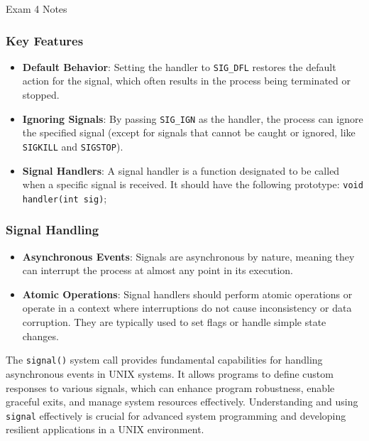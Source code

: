 \begin{examnotes}{Exam 4 Notes}
\begin{highlight}
        \subsubsection*{Key Features}

        \begin{itemize}
            \item \textbf{Default Behavior}: Setting the handler to \texttt{SIG\_DFL} restores the default action for the signal, which often results in the process being terminated or stopped.
            \item \textbf{Ignoring Signals}: By passing \texttt{SIG\_IGN} as the handler, the process can ignore the specified signal (except for signals that cannot be caught or ignored, like \texttt{SIGKILL} and \texttt{SIGSTOP}).
            \item \textbf{Signal Handlers}: A signal handler is a function designated to be called when a specific signal is received. It should have the following prototype: \texttt{void handler(int sig)};
        \end{itemize}

        \subsubsection*{Signal Handling}

        \begin{itemize}
            \item \textbf{Asynchronous Events}: Signals are asynchronous by nature, meaning they can interrupt the process at almost any point in its execution.
            \item \textbf{Atomic Operations}: Signal handlers should perform atomic operations or operate in a context where interruptions do not cause inconsistency or data corruption. They are 
            typically used to set flags or handle simple state changes.
        \end{itemize}

        The \texttt{signal()} system call provides fundamental capabilities for handling asynchronous events in UNIX systems. It allows programs to define custom responses to various signals, which 
        can enhance program robustness, enable graceful exits, and manage system resources effectively. Understanding and using \texttt{signal} effectively is crucial for advanced system programming 
        and developing resilient applications in a UNIX environment.
    \end{highlight}


\end{examnotes}
